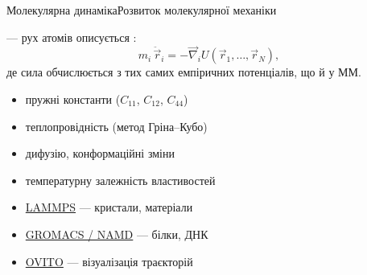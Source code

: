 \documentclass[]{beamer}
\begin{document}
\begin{frame}{Молекулярна динаміка}{Розвиток молекулярної механіки}\small
	\begin{block}{}
		 --- рух атомів описується :
		\begin{equation*}
			m_i\,\ddot{\vec{r}}_i = -\vec{\nabla}_i U(\vec{r}_1,\dots,\vec{r}_N),
		\end{equation*}
		де сила обчислюється з тих самих емпіричних потенціалів, що й у ММ.
	\end{block}

	\begin{block}{}\scriptsize
		\begin{itemize}
			\item пружні константи ($C_{11}$, $C_{12}$, $C_{44}$)
			\item теплопровідність (метод Гріна--Кубо)
			\item дифузію, конформаційні зміни
			\item температурну залежність властивостей
		\end{itemize}
		\vspace{0.4em}
		\begin{itemize}
			\item \href{https://www.lammps.org/\#gsc.tab=0}{LAMMPS} --- кристали, матеріали
			\item \href{https://www.gromacs.org}{GROMACS / NAMD} --- білки, ДНК
			\item \href{https://www.ovito.org}{OVITO} --- візуалізація траєкторій
		\end{itemize}
	\end{block}
\end{frame}
\end{document}
